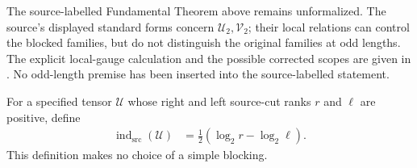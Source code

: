 \begin{remark}
    The source-labelled Fundamental Theorem above remains unformalized.
    The source's displayed standard forms concern
    $\mathcal U_2,\mathcal V_2$; their local relations can control the blocked
    families, but do not distinguish the original families at odd lengths.
    The explicit local-gauge calculation and the possible corrected scopes
    are given in \cite{gap:mpu_standard_form_parity_gap}. No odd-length
    premise has been inserted into the source-labelled statement.
\end{remark}

\begin{definition}
    \label{def:mpu_specified_source_index_value}
    \leanok
    For a specified tensor $\mathcal U$ whose right and left source-cut ranks
    $r$ and $\ell$ are positive, define
    \begin{align}
        \operatorname{ind}_{\mathrm{src}}(\mathcal U)
         & =\frac12(\log_2 r-\log_2\ell).
    \end{align}
    This definition makes no choice of a simple blocking.
\end{definition}

